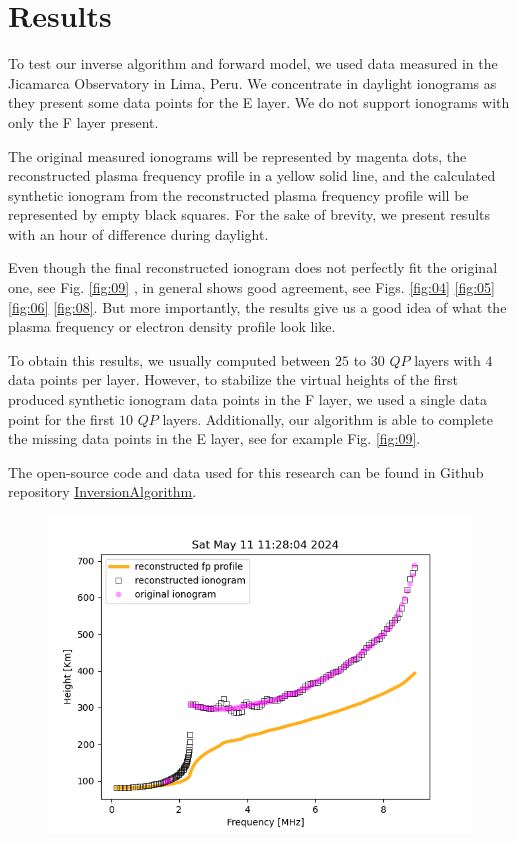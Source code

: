 \documentclass[aps,twocolumn,prb,showpacs,superscriptaddress]{revtex4-2}
\newcommand{\+}{\dagger}
\begin{document}
\section{Results}
To test our inverse algorithm and forward model, we used data measured in the Jicamarca Observatory in Lima, Peru. We concentrate in daylight ionograms as they present some data points for the E layer. We do not support ionograms with only the F layer present.

The original measured ionograms will be represented by magenta dots, the reconstructed plasma frequency profile in a yellow solid line, and the calculated synthetic ionogram from the reconstructed plasma frequency profile will be represented by empty black squares. For the sake of brevity, we present results with an hour of difference during daylight.

Even though the final reconstructed ionogram does not perfectly fit the original one, see Fig. \ref{fig:09} , in general shows good agreement, see Figs. \ref{fig:04} \ref{fig:05} \ref{fig:06} \ref{fig:08}. But more importantly, the results give us a good idea of what the plasma frequency or electron density profile look like.

To obtain this results, we usually computed between $25$ to $30$ $QP$ layers with $4$ data points per layer. However, to stabilize the virtual heights of the first produced synthetic ionogram data points in the F layer, we used a single data point for the first $10$ $QP$ layers. Additionally, our algorithm is able to complete the missing data points in the E layer, see for example Fig. \ref{fig:09}.

The open-source code and data used for this research can be found in Github repository \href{https://github.com/TAOGenna/inversion-algorithm-plasma-frequency-profile}{\underline{InversionAlgorithm}}.
\begin{figure}[htbp]
    \begin{center}
    \includegraphics*[width=0.90\columnwidth]{images/79.png}
    \end{center}
    \caption{}
    \label{fig:03}
\end{figure}
\end{document}
